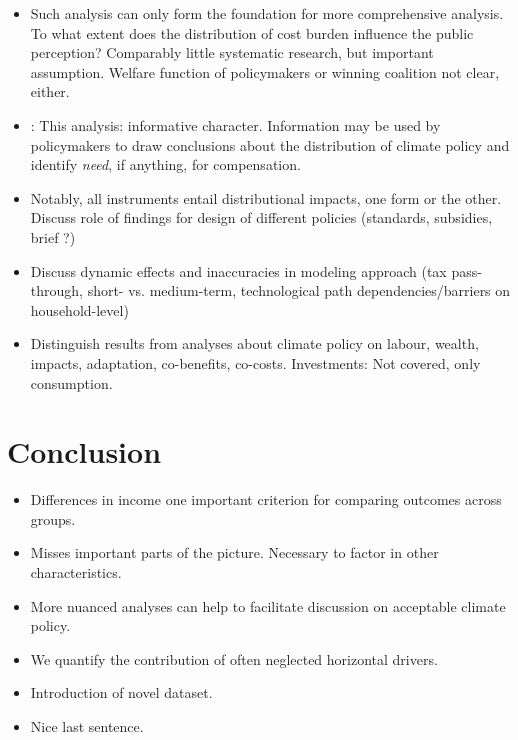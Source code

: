 \documentclass[12pt, a4paper]{article}
\begin{document}
\begin{itemize}
\item Such analysis can only form the foundation for more comprehensive analysis. To what extent does the distribution of cost burden influence the public perception? Comparably little systematic research, but important assumption. Welfare function of policymakers or winning coalition not clear, either. 
\item: This analysis: informative character. Information may be used by policymakers to draw conclusions about the distribution of climate policy and identify \textit{need}, if anything, for compensation. 
\item Notably, all instruments entail distributional impacts, one form or the other. Discuss role of findings for design of different policies (standards, subsidies, brief ?)
\item Discuss dynamic effects and inaccuracies in modeling approach (tax pass-through, short- vs. medium-term, technological path dependencies/barriers on household-level)
\item Distinguish results from analyses about climate policy on labour, wealth, impacts, adaptation, co-benefits, co-costs. Investments: Not covered, only consumption.
\end{itemize}

\section{Conclusion} \label{sec:conclusion}

\begin{itemize}
 \item Differences in income one important criterion for comparing outcomes across groups.
 \item Misses important parts of the picture. Necessary to factor in other characteristics.
 \item More nuanced analyses can help to facilitate discussion on acceptable climate policy.
 \item We quantify the contribution of often neglected horizontal drivers.
 \item Introduction of novel dataset.
 \item Nice last sentence.
\end{itemize}

\clearpage

\printbibliography

\clearpage
\end{document}
